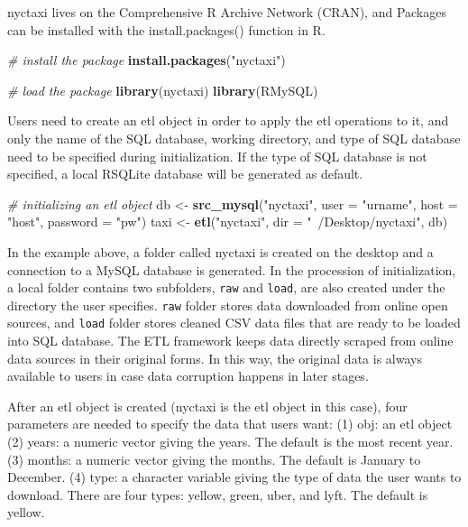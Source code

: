 \documentclass[12pt,twoside]{reedthesis}
\newenvironment{Shaded}{\begin{snugshade}}{\end{snugshade}}
\newcommand{\KeywordTok}[1]{\textcolor[rgb]{0.13,0.29,0.53}{\textbf{#1}}}
\newcommand{\DataTypeTok}[1]{\textcolor[rgb]{0.13,0.29,0.53}{#1}}
\newcommand{\StringTok}[1]{\textcolor[rgb]{0.31,0.60,0.02}{#1}}
\newcommand{\CommentTok}[1]{\textcolor[rgb]{0.56,0.35,0.01}{\textit{#1}}}
\newcommand{\NormalTok}[1]{#1}
\theoremstyle{definition}
\theoremstyle{definition}
\theoremstyle{definition}
\theoremstyle{remark}
\begin{document}
nyctaxi lives on the Comprehensive R Archive Network (CRAN), and
Packages can be installed with the install.packages() function in R.
\begin{Shaded}
\begin{Highlighting}[]
\CommentTok{# install the package}
\KeywordTok{install.packages}\NormalTok{(}\StringTok{"nyctaxi"}\NormalTok{)}
\end{Highlighting}
\end{Shaded}
\begin{Shaded}
\begin{Highlighting}[]
\CommentTok{# load the package}
\KeywordTok{library}\NormalTok{(nyctaxi)}
\KeywordTok{library}\NormalTok{(RMySQL)}
\end{Highlighting}
\end{Shaded}
Users need to create an etl object in order to apply the etl operations
to it, and only the name of the SQL database, working directory, and
type of SQL database need to be specified during initialization. If the
type of SQL database is not specified, a local RSQLite database will be
generated as default.
\begin{Shaded}
\begin{Highlighting}[]
\CommentTok{# initializing an etl object}
\NormalTok{db <-}\StringTok{ }\KeywordTok{src_mysql}\NormalTok{(}\StringTok{"nyctaxi"}\NormalTok{, }\DataTypeTok{user =} \StringTok{"urname"}\NormalTok{, }\DataTypeTok{host =} \StringTok{"host"}\NormalTok{, }
    \DataTypeTok{password =} \StringTok{"pw"}\NormalTok{)}
\NormalTok{taxi <-}\StringTok{ }\KeywordTok{etl}\NormalTok{(}\StringTok{"nyctaxi"}\NormalTok{, }\DataTypeTok{dir =} \StringTok{"~/Desktop/nyctaxi"}\NormalTok{, db)}
\end{Highlighting}
\end{Shaded}
In the example above, a folder called nyctaxi is created on the desktop
and a connection to a MySQL database is generated. In the procession of
initialization, a local folder contains two subfolders, \texttt{raw} and
\texttt{load}, are also created under the directory the user specifies.
\texttt{raw} folder stores data downloaded from online open sources, and
\texttt{load} folder stores cleaned CSV data files that are ready to be
loaded into SQL database. The ETL framework keeps data directly scraped
from online data sources in their original forms. In this way, the
original data is always available to users in case data corruption
happens in later stages.

After an etl object is created (nyctaxi is the etl object in this case),
four parameters are needed to specify the data that users want: (1) obj:
an etl object (2) years: a numeric vector giving the years. The default
is the most recent year. (3) months: a numeric vector giving the months.
The default is January to December. (4) type: a character variable
giving the type of data the user wants to download. There are four
types: yellow, green, uber, and lyft. The default is yellow.
\end{document}
